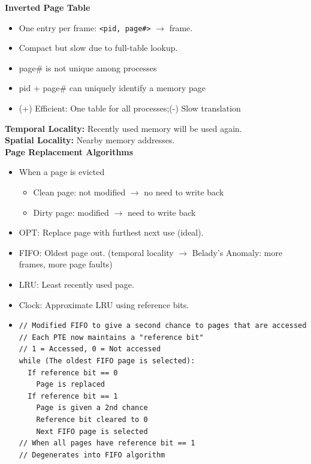 \documentclass[8pt,twocolumn]{article}
\begin{document}
\vspace{-0.6em}
\textbf{Inverted Page Table}
\vspace{-0.6em}
\begin{itemize}
    \setlength{\itemsep}{0pt} %
    \setlength{\parskip}{0pt}
  \item One entry per frame: \texttt{<pid, page\#>} $\rightarrow$ frame.
  \item Compact but slow due to full-table lookup.
  \item page\# is not unique among processes
  \item pid + page\# can uniquely identify a memory page  
  \item (+) Efficient: One table for all processes;(-) Slow translation

\end{itemize}
\vspace{-0.6em}
\textbf{Temporal Locality:} Recently used memory will be used again.\\
\textbf{Spatial Locality:} Nearby memory addresses.\\
\textbf{Page Replacement Algorithms}
\vspace{-0.6em}
\begin{itemize}
    \setlength{\itemsep}{0pt} %
    \setlength{\parskip}{0pt}
    \item When a page is evicted
\vspace{-0.4em}
    \begin{itemize}
         \setlength{\itemsep}{0pt} %
    \setlength{\parskip}{0pt}
      \item Clean page: not modified $\rightarrow$ no need to write back
      \item Dirty page: modified $\rightarrow$ need to write back   
    \end{itemize}
\vspace{-0.4em}
  \item OPT: Replace page with furthest next use (ideal).
  \item FIFO: Oldest page out. (temporal locality $\rightarrow$ Belady's Anomaly: more frames, more page faults)
  \item LRU: Least recently used page.
  \item Clock: Approximate LRU using reference bits.
  \item \vspace{-0.6em} \begin{lstlisting}
// Modified FIFO to give a second chance to pages that are accessed
// Each PTE now maintains a "reference bit"
// 1 = Accessed, 0 = Not accessed
while (The oldest FIFO page is selected):
  If reference bit == 0  
    Page is replaced
  If reference bit == 1  
    Page is given a 2nd chance
    Reference bit cleared to 0
    Next FIFO page is selected
// When all pages have reference bit == 1
// Degenerates into FIFO algorithm
  \end{lstlisting}
\vspace{-0.6em}
\end{itemize}
\end{document}
